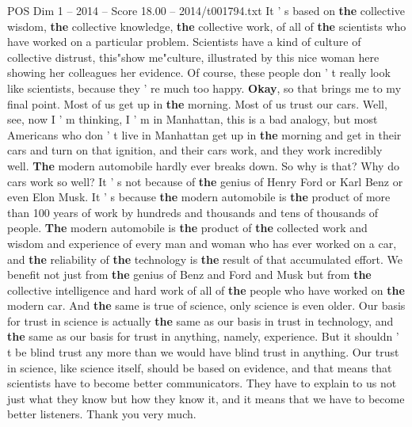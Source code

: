 \begin{textsample}{POS Dim 1 – 2014 – Score 18.00 – 2014/t001794.txt}
It ' s based on \textbf{the} collective wisdom, \textbf{the} collective knowledge, \textbf{the} collective work, of all of \textbf{the} scientists who have worked on a particular problem.
Scientists have a kind of culture of collective distrust, this"show me"culture, illustrated by this nice woman here showing her colleagues her evidence.
Of course, these people don ' t really look like scientists, because they ' re much too happy. \textbf{Okay}, so that brings me to my final point.
Most of us get up in \textbf{the} morning.
Most of us trust our cars.
Well, see, now I ' m thinking, I ' m in Manhattan, this is a bad analogy, but most Americans who don ' t live in Manhattan get up in \textbf{the} morning and get in their cars and turn on that ignition, and their cars work, and they work incredibly well. \textbf{The} modern automobile hardly ever breaks down.
So why is that?
Why do cars work so well?
It ' s not because of \textbf{the} genius of Henry Ford or Karl Benz or even Elon Musk.
It ' s because \textbf{the} modern automobile is \textbf{the} product of more than 100 years of work by hundreds and thousands and tens of thousands of people. \textbf{The} modern automobile is \textbf{the} product of \textbf{the} collected work and wisdom and experience of every man and woman who has ever worked on a car, and \textbf{the} reliability of \textbf{the} technology is \textbf{the} result of that accumulated effort.
We benefit not just from \textbf{the} genius of Benz and Ford and Musk but from \textbf{the} collective intelligence and hard work of all of \textbf{the} people who have worked on \textbf{the} modern car.
And \textbf{the} same is true of science, only science is even older.
Our basis for trust in science is actually \textbf{the} same as our basis in trust in technology, and \textbf{the} same as our basis for trust in anything, namely, experience.
But it shouldn ' t be blind trust any more than we would have blind trust in anything.
Our trust in science, like science itself, should be based on evidence, and that means that scientists have to become better communicators.
They have to explain to us not just what they know but how they know it, and it means that we have to become better listeners.
Thank you very much.

\end{textsample}
